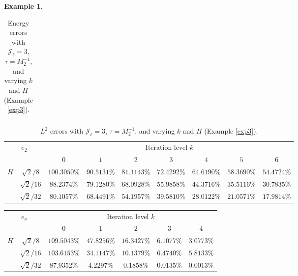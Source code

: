 \documentclass{article}[11pt]
\theoremstyle{definition}
\newtheorem{exmp}{Example}[section]
\begin{document}
\begin{exmp}
\begin{table}[ht]
\begin{tabular}{cc||ccccccc}
\hline
\end{tabular}
\caption{Energy errors with $\mathcal{J}_{\ell} = 3$, $\tau = M_2^{-1}$, and varying $k$ and $H$ (Example \ref{exp3}).}
\label{tab:exp3-v-subopt-2}
\end{table}

\begin{table}[ht]
\centering
\begin{tabular}{cc||ccccccc}
\hline
\multicolumn{2}{c||}{\multirow{2}{*}{$e_2$}}   & \multicolumn{7}{c}{Iteration level $k$}           \\ \cline{3-9} 
\multicolumn{2}{c||}{} &   $0$ & $1$   & $2$   & $3$   & $4$   &$5$ & $6$ \\ 
\hline \hline
\multicolumn{1}{c|}{\multirow{3}{*}{$H$}} & 
 $\sqrt{2}/8$ & $100.3050\%$ & $90.5131\%$ & $81.1143\%$ & $72.4292\%$ & $64.6190\%$ & $58.3690\%$ & $54.4724\%$ \\ 

\multicolumn{1}{c|}{} &  
 $\sqrt{2}/16$ & $88.2374\%$ & $79.1280\%$ & $68.0928\%$ & $55.9858\%$ & $44.3716\%$ & $35.5116\%$ & $30.7835\%$ \\

\multicolumn{1}{c|}{} &  
 $\sqrt{2}/32$ & $80.1057\%$ & $68.4491\%$ & $54.1957\%$ & $39.5810\%$ & $28.0122\%$ & $21.0571\%$ & $17.9814\%$ \\

\hline
\end{tabular}
\caption{$L^2$ errors with $\mathcal{J}_{\ell} = 3$, $\tau = M_2^{-1}$, and varying $k$ and $H$ (Example \ref{exp3}).}
\label{tab:exp3-p-subopt-2}
\end{table}

\begin{table}[ht]
\centering
\begin{tabular}{cc||ccccc}
\hline
\multicolumn{2}{c||}{\multirow{2}{*}{$e_a$}}   & \multicolumn{5}{c}{Iteration level $k$}           \\ \cline{3-7} 
\multicolumn{2}{c||}{} &   $0$ & $1$   & $2$   & $3$   & $4$   \\ 
\hline \hline
\multicolumn{1}{c|}{\multirow{3}{*}{$H$}} & 
$\sqrt{2}/8$ & $109.5043\%$ & $47.8256\%$ & $16.3427\%$ & $6.1077\%$ & $3.0773\%$ \\

\multicolumn{1}{c|}{} &  
 $\sqrt{2}/16$ & $103.6153\%$ & $34.1147\%$ & $10.1379\%$ & $6.4740\%$ & $5.8133\%$ \\


\multicolumn{1}{c|}{} &  
 $\sqrt{2}/32$ & $87.9352\%$ & $4.2297\%$ & $0.1858\%$ & $0.0135\%$ & $0.0013\%$ \\


\end{tabular}
\end{table}
\end{exmp}
\end{document}

